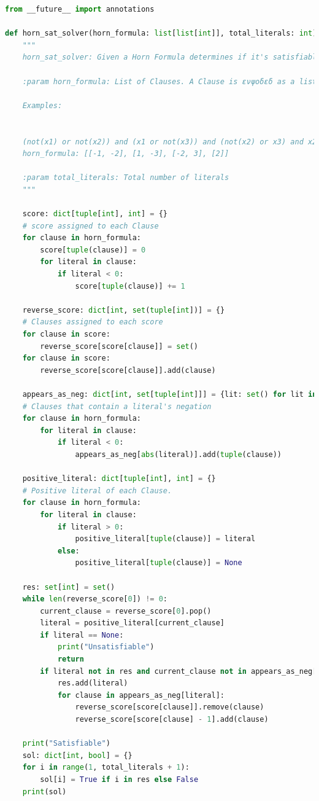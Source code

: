 \documentclass[11pt,letterpaper]{article}
\begin{document}
\lstset{style=mystyle}
\begin{lstlisting}[language=Python]
from __future__ import annotations

def horn_sat_solver(horn_formula: list[list[int]], total_literals: int) -> None:
    """
    horn_sat_solver: Given a Horn Formula determines if it's satisfiable

    :param horn_formula: List of Clauses. A Clause is ενψοδεδ as a list of ints.
    
    Examples:
    

    (not(x1) or not(x2)) and (x1 or not(x3)) and (not(x2) or x3) and x2
    horn_formula: [[-1, -2], [1, -3], [-2, 3], [2]]

    :param total_literals: Total number of literals
    """

    score: dict[tuple[int], int] = {}
    # score assigned to each Clause
    for clause in horn_formula:
        score[tuple(clause)] = 0
        for literal in clause:
            if literal < 0:
                score[tuple(clause)] += 1

    reverse_score: dict[int, set(tuple[int])] = {}
    # Clauses assigned to each score
    for clause in score:
        reverse_score[score[clause]] = set()
    for clause in score:
        reverse_score[score[clause]].add(clause)

    appears_as_neg: dict[int, set[tuple[int]]] = {lit: set() for lit in range(1, total_literals + 1)}
    # Clauses that contain a literal's negation
    for clause in horn_formula:
        for literal in clause:
            if literal < 0:
                appears_as_neg[abs(literal)].add(tuple(clause))

    positive_literal: dict[tuple[int], int] = {}
    # Positive literal of each Clause. 
    for clause in horn_formula:
        for literal in clause:
            if literal > 0:
                positive_literal[tuple(clause)] = literal
            else:
                positive_literal[tuple(clause)] = None

    res: set[int] = set()
    while len(reverse_score[0]) != 0:
        current_clause = reverse_score[0].pop()
        literal = positive_literal[current_clause]
        if literal == None:
            print("Unsatisfiable")
            return
        if literal not in res and current_clause not in appears_as_neg[literal]:
            res.add(literal)
            for clause in appears_as_neg[literal]:
                reverse_score[score[clause]].remove(clause)
                reverse_score[score[clause] - 1].add(clause)

    print("Satisfiable")
    sol: dict[int, bool] = {}
    for i in range(1, total_literals + 1):
        sol[i] = True if i in res else False
    print(sol)
\end{lstlisting}
\end{document}
